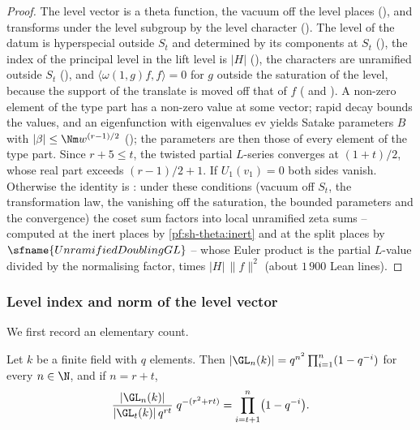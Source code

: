 \begin{proof}
The level vector is a theta function, the vacuum off the level places
(), and transforms under the level subgroup by the level
character (). The level of the datum is hyperspecial
outside $S_t$ and determined by its components at $S_t$ (), the
index of the principal level in the lift level is $|H|$ (), the
characters are unramified outside $S_t$ (), and
$\langle\omega(1,g)f,f\rangle=0$ for $g$ outside the saturation of the level, because the support of the translate is moved off that
of $f$ ( and ).
A non-zero element of the type part has a non-zero value at some vector; rapid decay bounds the values, and an eigenfunction with
eigenvalues $\mathrm{ev}$ yields Satake parameters $B$ with $|\beta|\le\Nm w^{(r-1)/2}$
(); the parameters are then those of every element of the
type part. Since $r+5\le t$, the twisted partial $L$-series converges at $(1+t)/2$, whose real part exceeds $(r-1)/2+1$. If
$U_1(v_1)=0$ both sides vanish. Otherwise the identity is : under these conditions (vacuum
off $S_t$, the transformation law, the vanishing off the saturation, the bounded parameters and the convergence) the coset sum
factors into local unramified zeta sums -- computed at the inert places by \cref{pf:sh-theta:inert} and at the split places by
$\sfname{UnramifiedDoublingGL}$ -- whose Euler product is the partial $L$-value divided by the normalising factor, times
$|H|\,\|f\|^2$ (about $1\,900$ Lean lines).
\end{proof}

\subsubsection{Level index and norm of the level vector}

We first record an elementary count.

\begin{lemma}\label{pf:sh-theta:glindex}
Let $k$ be a finite field with $q$ elements. Then $|\GL_n(k)|=q^{n^2}\prod_{i=1}^n(1-q^{-i})$ for every $n\in\N$, and if
$n=r+t$,
\[
\frac{|\GL_n(k)|}{|\GL_t(k)|\,q^{rt}}\;q^{-(r^2+rt)}=\prod_{i=t+1}^{n}\bigl(1-q^{-i}\bigr).
\]
\end{lemma}

